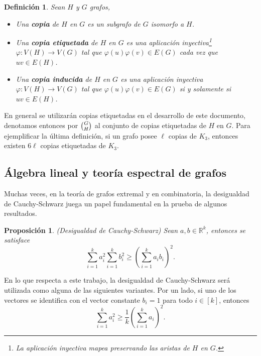 \documentclass{article}[14pts]
\newtheorem{prop}{Proposición}
\newtheorem{definicion}{Definición}
\begin{document}
\begin{definicion}
    Sean $H$ y $G$ grafos,
    \begin{itemize}
        \item Una \textbf{copia} de $H$ en $G$ es un subgrafo de $G$ isomorfo a $H$.
        \item Una \textbf{copia etiquetada} de $H$ en $G$ es una aplicación inyectiva\footnote{La aplicación inyectiva mapea preservando las aristas de $H$ en $G$.} $\varphi : V(H)\to V(G)$ tal que $\varphi(u)\varphi(v)\in E(G)$ cada vez que $uv\in E(H)$.
        \item Una \textbf{copia inducida} de $H$ en $G$ es una aplicación inyectiva $\varphi : V(H)\to V(G)$ tal que $\varphi(u)\varphi(v)\in E(G)$ si y solamente si $uv\in E(H)$.
    \end{itemize}
\end{definicion}

En general se utilizarán copias etiquetadas en el desarrollo de este documento, denotamos entonces por $\tbinom{G}{H}$ al conjunto de copias etiquetadas de $H$ en $G$. Para ejemplificar la última definición, si un grafo posee $\ell$ copias de $K_3$, entonces existen $6\ell$ copias etiquetadas de $K_3$.

\subsection{Álgebra lineal y teoría espectral de grafos} \label{Sección AL}

Muchas veces, en la teoría de grafos extremal y en combinatoria, la desigualdad de Cauchy-Schwarz juega un papel fundamental en la prueba de algunos resultados.

\begin{prop} (Desigualdad de Cauchy-Schwarz)
    Sean $a,b\in \mathbb{R}^{k}$, entonces se satisface
    \begin{equation*}
        \sum_{i=1}^{k}a_{i}^{2}\sum_{i=1}^{k}b_i^{2} \geq \left( \sum_{i=1}^{k}a_{i}b_{i}\right)^{2}.
    \end{equation*}
\end{prop}

En lo que respecta a este trabajo, la desigualdad de Cauchy-Schwarz será utilizada como alguna de las siguientes variantes. Por un lado, si uno de los vectores se identifica con el vector constante $b_i = 1$ para todo $i\in [k]$, entonces
\begin{equation} \label{CS_versión1}
    \sum_{i=1}^{k}a_{i}^{2} \geq \frac{1}{k}\left( \sum_{i=1}^{k} a_{i}\right)^{2}.
\end{equation}
\end{document}
